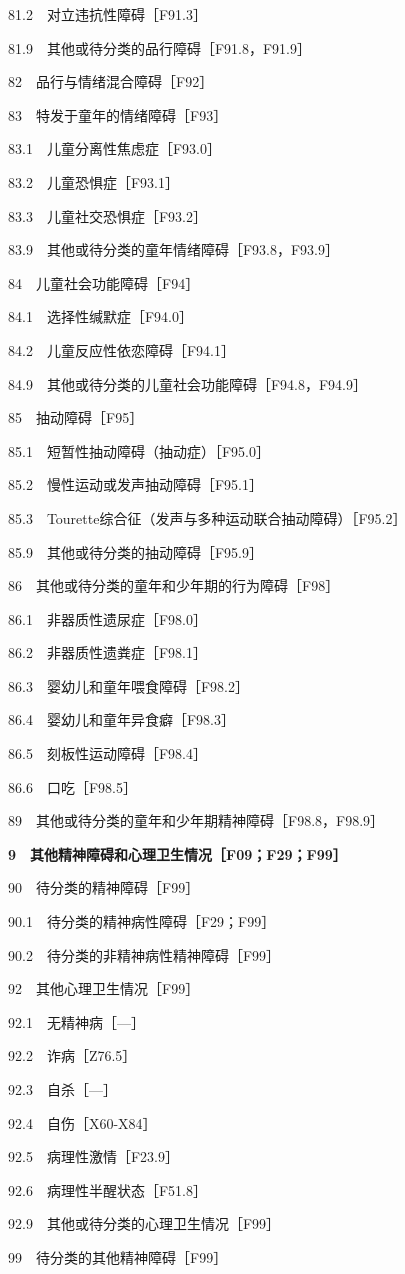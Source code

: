 81.2　对立违抗性障碍［F91.3］

81.9　其他或待分类的品行障碍［F91.8，F91.9］

82　品行与情绪混合障碍［F92］

83　特发于童年的情绪障碍［F93］

83.1　儿童分离性焦虑症［F93.0］

83.2　儿童恐惧症［F93.1］

83.3　儿童社交恐惧症［F93.2］

83.9　其他或待分类的童年情绪障碍［F93.8，F93.9］

84　儿童社会功能障碍［F94］

84.1　选择性缄默症［F94.0］

84.2　儿童反应性依恋障碍［F94.1］

84.9　其他或待分类的儿童社会功能障碍［F94.8，F94.9］

85　抽动障碍［F95］

85.1　短暂性抽动障碍（抽动症）［F95.0］

85.2　慢性运动或发声抽动障碍［F95.1］

85.3　Tourette综合征（发声与多种运动联合抽动障碍）［F95.2］

85.9　其他或待分类的抽动障碍［F95.9］

86　其他或待分类的童年和少年期的行为障碍［F98］

86.1　非器质性遗尿症［F98.0］

86.2　非器质性遗粪症［F98.1］

86.3　婴幼儿和童年喂食障碍［F98.2］

86.4　婴幼儿和童年异食癖［F98.3］

86.5　刻板性运动障碍［F98.4］

86.6　口吃［F98.5］

89　其他或待分类的童年和少年期精神障碍［F98.8，F98.9］

\textbf{9　其他精神障碍和心理卫生情况［F09；F29；F99］}

90　待分类的精神障碍［F99］

90.1　待分类的精神病性障碍［F29；F99］

90.2　待分类的非精神病性精神障碍［F99］

92　其他心理卫生情况［F99］

92.1　无精神病［---］

92.2　诈病［Z76.5］

92.3　自杀［---］

92.4　自伤［X60-X84］

92.5　病理性激情［F23.9］

92.6　病理性半醒状态［F51.8］

92.9　其他或待分类的心理卫生情况［F99］

99　待分类的其他精神障碍［F99］



